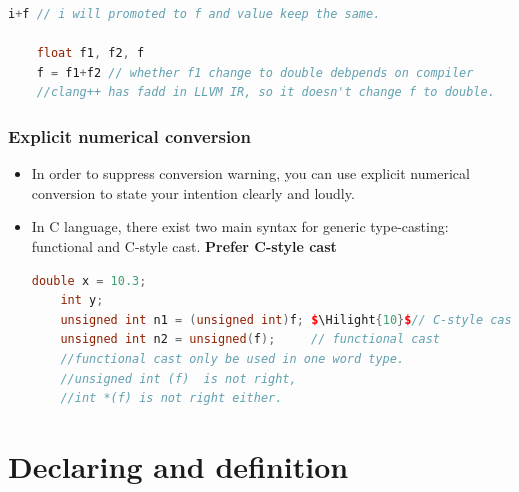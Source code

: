 \documentclass[a4paper,12pt,twoside]{book}
\newcommand{\Hilight}[1]{\makebox[0pt][l]{\color{yellow}\rule[-3pt]{#1em}{11pt}}}
\begin{document}
\begin{itemize}
\begin{lstlisting}[frame=single, language=c++, mathescape=true]
	i+f // i will promoted to f and value keep the same.
	
	float f1, f2, f
	f = f1+f2 // whether f1 change to double debpends on compiler
	//clang++ has fadd in LLVM IR, so it doesn't change f to double.
	\end{lstlisting}
\end{itemize}

\subsubsection{Explicit numerical conversion}
\begin{itemize}
	\item In order to suppress conversion warning, you can use explicit numerical conversion to state your intention clearly and loudly.
	
	\item In C language, there exist two main syntax for generic type-casting: functional and C-style cast.  \textbf{Prefer C-style cast}
	
	\begin{lstlisting}[frame=single, language=c++, mathescape=true]
	double x = 10.3;
	int y;
	unsigned int n1 = (unsigned int)f; $\Hilight{10}$// C-style cast
	unsigned int n2 = unsigned(f);     // functional cast
	//functional cast only be used in one word type.
	//unsigned int (f)  is not right,
	//int *(f) is not right either.
	\end{lstlisting}
	
\end{itemize}


\section{Declaring and definition}
\end{document}

